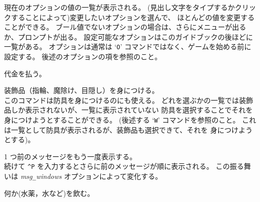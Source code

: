 現在のオプションの値の一覧が表示される。
(見出し文字をタイプするかクリックすることによって)変更したいオプションを選んで、
ほとんどの値を変更することができる。
ブール値でないオプションの場合は、さらにメニューが出るか、プロンプトが出る。
設定可能なオプションはこのガイドブックの後ほどに一覧がある。
オプションは通常は `{\tt O}' コマンドではなく、ゲームを始める前に設定する。
後述のオプションの項を参照のこと。
\item[\tb{p}]
代金を払う。
\item[\tb{P}]
装飾品（指輪、魔除け、目隠し）を身につける。\\
このコマンドは防具を身につけるのにも使える。
どれを選ぶかの一覧では装飾品しか表示されないが、一覧に表示されていない
防具を選択することでそれを身につけようとすることができる。
(後述する `{\tt W}' コマンドを参照のこと。
これは一覧として防具が表示されるが、装飾品も選択できて、それを
身につけようとする)。
\item[\tb{\^{}P}]
1 つ前のメッセージをもう一度表示する。\\
続けて {\tt \^{}P} を入力するとさらに前のメッセージが順に表示される。
この振る舞いは {\it msg\verb+_+windows} オプションによって変化する。
\item[\tb{q}]
何か(水薬，水など)を飲む。
\item[\tb{Q}]
